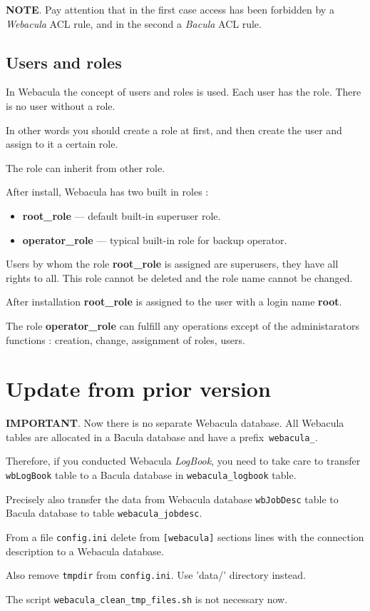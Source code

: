 \documentclass[10pt]{article}
\begin{document}
\textbf{NOTE}.
Pay attention that in the first case access has been forbidden by a \textit{Webacula} ACL rule,
and in the second a \textit{Bacula} ACL rule.


\subsection{Users and roles}
\label{Setup:Users and roles}

In Webacula the concept of users and roles is used.
Each user has the role. There is no user without a role.

In other words you should create a role at first, and then create the user and assign to it a certain role.

The role can inherit from other role.

After install, Webacula has two built in roles :

\begin{itemize}
  \item \textbf{root\_role} --- default built-in superuser role.
  \item \textbf{operator\_role} --- typical built-in role for backup operator.
\end{itemize}

Users by whom the role \textbf{root\_role} is assigned are superusers, they have all rights to all.
This role cannot be deleted and the role name cannot be changed.

After installation \textbf{root\_role} is assigned to the user with a login name \textbf{root}.

The role \textbf{operator\_role} can fulfill any operations except of the administarators functions :
creation, change, assignment of roles, users.



\section{Update from prior version}
\label{Update}

\textbf{IMPORTANT}. Now there is no separate Webacula database.
All Webacula tables are allocated in a Bacula database and have a prefix\texttt{ webacula\_}.

Therefore, if you conducted Webacula \textit{LogBook}, you need to take care to transfer \texttt{wbLogBook} table
to a Bacula database in \texttt{webacula\_logbook} table.

Precisely also transfer the data from Webacula database \texttt{wbJobDesc} table
to Bacula database to table \texttt{webacula\_jobdesc}.

From a file \texttt{config.ini} delete from \texttt{[webacula]} sections lines with the connection
description to a Webacula database.

Also remove \texttt{tmpdir} from \texttt{config.ini}. Use 'data/' directory instead.

The script \texttt{webacula\_clean\_tmp\_files.sh} is not necessary now.
\end{document}
